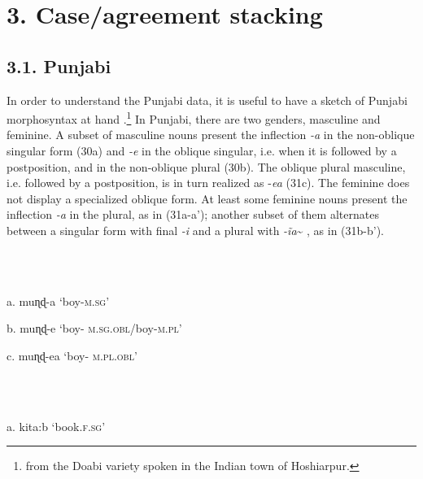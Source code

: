 \documentclass[output=paper]{langsci/langscibook}
\begin{document}
\section{ 3. Case/agreement stacking} 

\subsection{ 3.1. Punjabi}

\begin{stylefootnotetext}
In order to understand the Punjabi data, it is useful to have a sketch of Punjabi morphosyntax at hand \citep{Bhatia2000}.\footnote{ from the Doabi variety spoken in the Indian town of Hoshiarpur.  }{} In Punjabi, there are two genders, masculine and feminine. A subset of masculine nouns present the inflection \textit{{}-a} in the non-oblique singular form (30a) and \textit{{}-e} in the oblique singular, i.e. when it is followed by a postposition, and in the non-oblique plural (30b). The oblique plural masculine, i.e. followed by a postposition, is in turn realized as -\textit{ea} (31c). The feminine does not display a specialized oblique form. At least some feminine nouns present the inflection \textit{{}-a} in the plural, as in (31a-a’); another subset of them alternates between a singular form with final \textit{{}-i} and a plural with \textit{{}-ĩa}\~{} , as in (31b-b’). 
\end{stylefootnotetext}

\begin{styleparagrafo}
\ea%
    \label{ex:key:30}
    \gll\\
        \\
    \glt
    \z

          a.   muɳɖ-a       ‘boy-\textsc{m.sg}’
\end{styleparagrafo}

\begin{styleparagrafo}
b.  muɳɖ-e       ‘boy- \textsc{m.sg.obl}/boy-\textsc{m.pl}’  
\end{styleparagrafo}

\begin{styleparagrafo}
c.  muɳɖ-ea       ‘boy- \textsc{m.pl.obl}’
\end{styleparagrafo}

\begin{styleparagrafo}
\ea%
    \label{ex:key:31}
    \gll\\
        \\
    \glt
    \z

          a.  kita:b        ‘book.\textsc{f.sg}’
\end{styleparagrafo}
\end{document}
